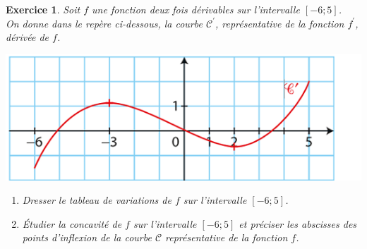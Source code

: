 \documentclass[12pt,a4paper]{article}
\theoremstyle{mystyle}
\newtheorem{exo}{Exercice}
\begin{document}
\begin{exo}
Soit $f$ une fonction deux fois dérivables sur l'intervalle $[-6;5]$.\\
On donne dans le repère ci-dessous, la courbe $\mathcal{C}^{\prime}$, représentative de la fonction $f^{\prime}$, dérivée de $f$.
\begin{center}
	\includegraphics[scale=0.8]{graphe3.png}
\end{center}
\begin{enumerate}
	\item Dresser le tableau de variations de $f$ sur l'intervalle $[-6;5]$.
	\item Étudier la concavité de $f$ sur l'intervalle $[-6;5]$ et préciser les abscisses des points d'inflexion de la courbe $\mathcal{C}$ représentative de la fonction $f$.
\end{enumerate}

\end{exo}
\end{document}
